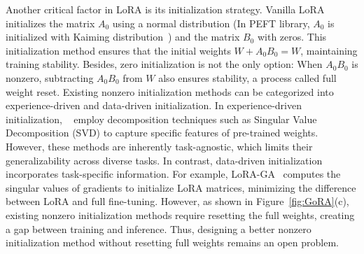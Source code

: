 Another critical factor in LoRA is its initialization strategy. Vanilla LoRA initializes the matrix \(A_0\) using a normal distribution (In PEFT library, \(A_0\) is initialized with Kaiming distribution~\citep{he2015delving}) and the matrix \(B_0\) with zeros. This initialization method ensures that the initial weights \(W + A_0B_0 = W\), maintaining training stability. Besides, zero initialization is not the only option: When \(A_0B_0\) is nonzero, subtracting \(A_0B_0\) from \(W\) also ensures stability, a process called full weight reset. Existing nonzero initialization methods can be categorized into experience-driven and data-driven initialization. In experience-driven initialization, ~\citet{meng2024pissa, wang2024milora} employ decomposition techniques such as Singular Value Decomposition (SVD) to capture specific features of pre-trained weights. However, these methods are inherently task-agnostic, which limits their generalizability across diverse tasks. In contrast, data-driven initialization incorporates task-specific information. For example, LoRA-GA~\citep{wang2024lora-ga} computes the singular values of gradients to initialize LoRA matrices, minimizing the difference between LoRA and full fine-tuning.
However, as shown in Figure~\ref{fig:GoRA}(c), existing nonzero initialization methods require resetting the full weights, creating a gap between training and inference. Thus, designing a better nonzero initialization method without resetting full weights remains an open problem.

